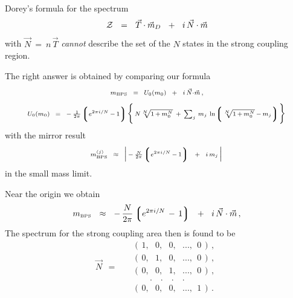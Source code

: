 \documentclass[12pt,letterpaper,landscape,KOMA,smallheadings,calcdimensions,display]{powersem}
\newcommand{\mbps}{m_{\text{\tiny BPS}}}
\begin{document}
\begin{slide}

	Dorey's formula for the spectrum
\[
	\mathcal{Z} ~~=~~ \vec{T} \cdot \vec{m}{}_D ~~+~~ i\, \vec{N} \cdot \vec{m}
\]
	with $ \vec{N} ~=~ n\, \vec{T} $
	\emph{cannot} describe the set of the $ N $ states in the strong coupling region.

	The right answer is obtained by comparing our formula 
\[
\scriptstyle
	\mbps ~~=~~ U_0 (m_0) ~~+~~ i\, \vec{N} \cdot \vec{m}\,,
\]
\[
\scriptstyle
	U_0 (m_0) ~~=~~ -\, \frac{1}{2\pi} \left\lgroup e^{2\pi i / N} \,-\, 1 \right\rgroup 
	\biggl\{\, N \sqrt[N] { 1 \,+\, m_0^N }  ~+~ 
	\sum_j\, m_j\, \ln  \left\lgroup \sqrt[N] {1 \,+\,  m_0^N } \,-\, m_j \right\rgroup  \biggr\}\,
\]
	with the mirror result
\[
\scriptstyle
	\mbps^{(j)} ~~\approx~~ \Big|\, -\, \frac{N}{2\pi} \lgr e^{2\pi i / N} \,-\, 1 \rgr 
			   ~~+~~ i\, m_j \,\Big|\,
\]
	in the small mass limit. 

\end{slide}


\begin{slide}
	Near the origin we obtain
\[
	\mbps ~~\approx~~ -\, \frac{N}{2\pi} \lgr e^{2\pi i / N} \,-\, 1 \rgr ~~+~~ i\, \vec{N} \cdot \vec{m}\,,
\]
	The spectrum for the strong coupling area then is found to be
\[
\label{scpn}
	\vec{N} ~~=~~ 
			\quad
				\begin{array}{l} 
					(\, 1,~~~   0,~~~   0,~~~ ...,~~ 0 \,)\,, \\[1.5mm]
					(\, 0,~~~   1,~~~   0,~~~ ...,~~ 0 \,)\,, \\[1.5mm]
					(\, 0,~~~   0,~~~   1,~~~ ...,~~ 0 \,)\,, \\[0.5mm]
					\quad\quad.\quad.\quad.\quad.         \\
					(\, 0,~~~   0,~~~   0,~~~ ...,~~ 1 \,)\,.
				\end{array} 
\]
\vspace{-0.8cm}

\end{slide}
\end{document}
